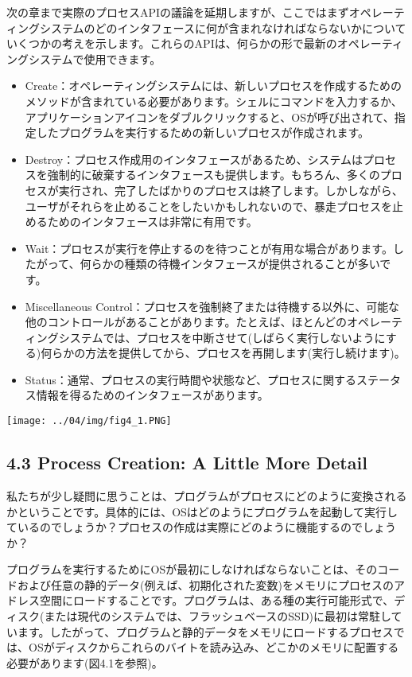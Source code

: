 次の章まで実際のプロセスAPIの議論を延期しますが、ここではまずオペレーティングシステムのどのインタフェースに何が含まれなければならないかについていくつかの考えを示します。これらのAPIは、何らかの形で最新のオペレーティングシステムで使用できます。

\begin{itemize}
\item
  Create：オペレーティングシステムには、新しいプロセスを作成するためのメソッドが含まれている必要があります。シェルにコマンドを入力するか、アプリケーションアイコンをダブルクリックすると、OSが呼び出されて、指定したプログラムを実行するための新しいプロセスが作成されます。
\item
  Destroy：プロセス作成用のインタフェースがあるため、システムはプロセスを強制的に破棄するインタフェースも提供します。もちろん、多くのプロセスが実行され、完了したばかりのプロセスは終了します。しかしながら、ユーザがそれらを止めることをしたいかもしれないので、暴走プロセスを止めるためのインタフェースは非常に有用です。
\item
  Wait：プロセスが実行を停止するのを待つことが有用な場合があります。したがって、何らかの種類の待機インタフェースが提供されることが多いです。
\item
  Miscellaneous
  Control：プロセスを強制終了または待機する以外に、可能な他のコントロールがあることがあります。たとえば、ほとんどのオペレーティングシステムでは、プロセスを中断させて(しばらく実行しないようにする)何らかの方法を提供してから、プロセスを再開します(実行し続けます)。
\item
  Status：通常、プロセスの実行時間や状態など、プロセスに関するステータス情報を得るためのインタフェースがあります。
\end{itemize}

\texttt{[image: ../04/img/fig4\_1.PNG]}

\hypertarget{process-creation-a-little-more-detail}{%
\subsection*{4.3 Process Creation: A Little More
Detail}\label{process-creation-a-little-more-detail}}

私たちが少し疑問に思うことは、プログラムがプロセスにどのように変換されるかということです。具体的には、OSはどのようにプログラムを起動して実行しているのでしょうか？プロセスの作成は実際にどのように機能するのでしょうか？

プログラムを実行するためにOSが最初にしなければならないことは、そのコードおよび任意の静的データ(例えば、初期化された変数)をメモリにプロセスのアドレス空間にロードすることです。プログラムは、ある種の実行可能形式で、ディスク(または現代のシステムでは、フラッシュベースのSSD)に最初は常駐しています。したがって、プログラムと静的データをメモリにロードするプロセスでは、OSがディスクからこれらのバイトを読み込み、どこかのメモリに配置する必要があります(図4.1を参照)。

